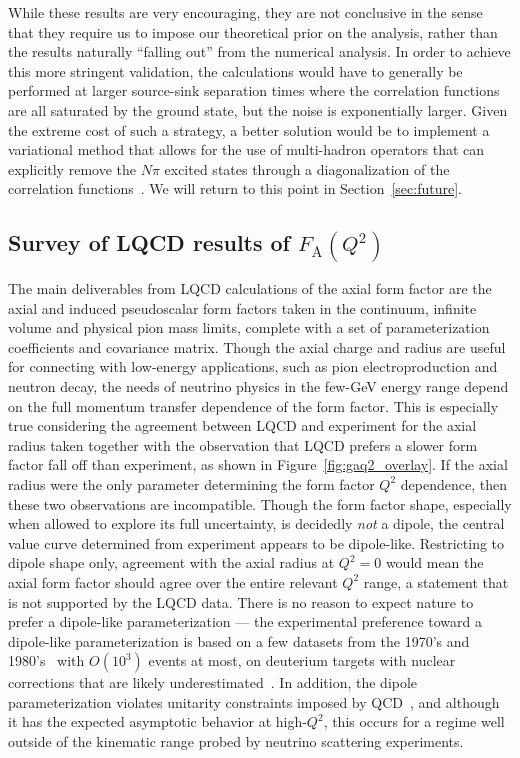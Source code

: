 \documentclass{ar-1col}
\begin{document}
While these results are very encouraging, they are not conclusive in the sense that they require us to impose our theoretical prior on the analysis, rather than the results naturally ``falling out'' from the numerical analysis.
In order to achieve this more stringent validation, the calculations would have to generally be performed at larger source-sink separation times where the correlation functions are all saturated by the ground state, but the noise is exponentially larger.
Given the extreme cost of such a strategy, a better solution would be to implement a variational method that allows for the use of multi-hadron operators that can explicitly remove the $N\pi$ excited states through a diagonalization of the correlation functions~\cite{Blossier:2009kd}.  We will return to this point in Section~\ref{sec:future}.


\subsection{Survey of LQCD results of $F_{\mathrm{A}}(Q^2)$\label{sec:lqcd_results}}

The main deliverables from LQCD calculations of the axial form factor
 are the axial and induced pseudoscalar form factors taken in the continuum,
 infinite volume and physical pion mass limits, complete with a set of parameterization coefficients
 and covariance matrix.
Though the axial charge and radius are useful for connecting with low-energy applications,
 such as pion electroproduction and neutron decay,
 the needs of neutrino physics in the few-GeV energy range depend
 on the full momentum transfer dependence of the form factor.
 This is especially true considering the agreement between LQCD and experiment
 for the axial radius taken together with the observation that
 LQCD prefers a slower form factor fall off than experiment,
 as shown in Figure~\ref{fig:gaq2_overlay}.
If the axial radius were the only parameter determining the form factor $Q^2$ dependence,
 then these two observations are incompatible.
Though the form factor shape, especially when allowed to explore its full uncertainty,
 is decidedly \emph{not} a dipole, the central value curve determined
 from experiment appears to be dipole-like.
Restricting to dipole shape only, agreement with the axial radius at $Q^2=0$
 would mean the axial form factor should agree over the entire relevant $Q^2$ range,
 a statement that is not supported by the LQCD data.
There is no reason to expect nature to prefer a dipole-like parameterization ---
 the experimental preference toward a dipole-like parameterization is based on
 a few datasets from the 1970's and 1980's~\cite{ANL_Barish_1977, BNL_Baker_1981, Kitagaki:1983px}
 with $O(10^3)$ events at most,
 on deuterium targets with nuclear corrections that are likely underestimated~\cite{Meyer:2016oeg}.
In addition, the dipole parameterization violates
 unitarity constraints imposed by QCD~\cite{Bhattacharya:2011ah},
 and although it has the expected asymptotic behavior at high-$Q^2$,
 this occurs for a regime well outside of the kinematic range probed
 by neutrino scattering experiments.
\end{document}
